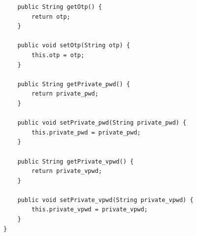 \documentclass[a4paper, 12pt]{article}
\newenvironment{code}{\captionsetup{type=listing}}{}
\begin{document}
\begin{code}
\begin{verbatim}
    public String getOtp() {
        return otp;
    }

    public void setOtp(String otp) {
        this.otp = otp;
    }

    public String getPrivate_pwd() {
        return private_pwd;
    }

    public void setPrivate_pwd(String private_pwd) {
        this.private_pwd = private_pwd;
    }

    public String getPrivate_vpwd() {
        return private_vpwd;
    }

    public void setPrivate_vpwd(String private_vpwd) {
        this.private_vpwd = private_vpwd;
    }
}

\end{verbatim}
\end{code}
\bigbreak
\end{document}
